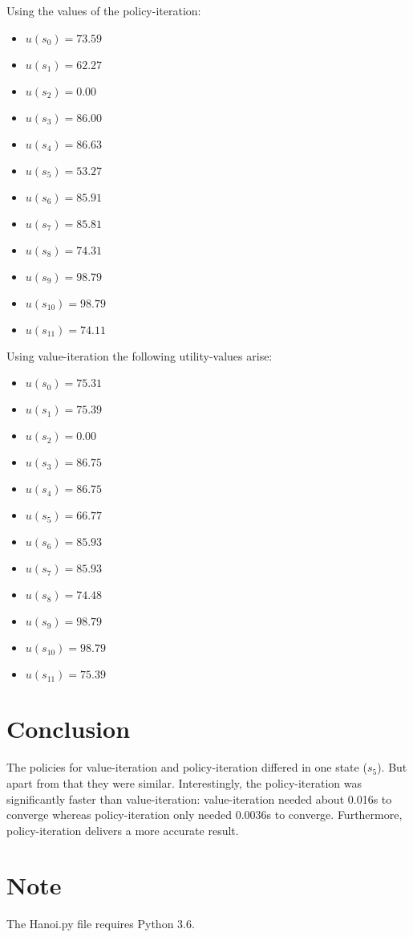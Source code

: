 \documentclass[a4paper]{article}
\begin{document}
\newpage
Using the values of the policy-iteration:
\begin{multicols}{2}
\begin{itemize}
\item $u(s_0) = 73.59 $
\item $u(s_1) = 62.27 $
\item $u(s_2) = 0.00 $
\item $u(s_3) = 86.00 $
\item $u(s_4) = 86.63 $
\item $u(s_5) = 53.27 $
\item $u(s_6) = 85.91 $
\item $u(s_7) = 85.81 $
\item $u(s_8) = 74.31 $
\item $u(s_9) = 98.79 $
\item $u(s_{10}) = 98.79 $
\item $u(s_{11}) = 74.11 $
\end{itemize}
\end{multicols}

\noindent
Using value-iteration the following utility-values arise:
\begin{multicols}{2}
\begin{itemize}
\item $u(s_0) = 75.31 $
\item $u(s_1) = 75.39 $
\item $u(s_2) = 0.00 $
\item $u(s_3) = 86.75 $
\item $u(s_4) = 86.75 $
\item $u(s_5) = 66.77 $
\item $u(s_6) = 85.93 $
\item $u(s_7) = 85.93 $
\item $u(s_8) = 74.48 $
\item $u(s_9) = 98.79 $
\item $u(s_{10}) = 98.79 $
\item $u(s_{11}) = 75.39 $
\end{itemize}
\end{multicols}

\section{Conclusion}
The policies for value-iteration and policy-iteration differed in one state ($s_5$). But apart from that they were similar. Interestingly, the policy-iteration was significantly faster than value-iteration: value-iteration needed about 0.016s to converge whereas policy-iteration only needed 0.0036s to converge. Furthermore, policy-iteration delivers a more accurate result.

\section{Note}
The Hanoi.py file requires Python 3.6.
\end{document}

